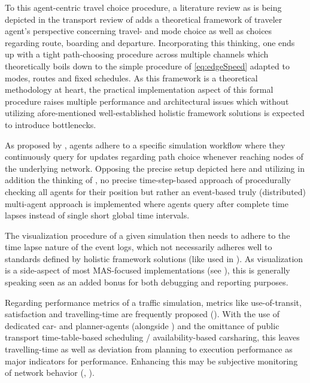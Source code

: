 To this agent-centric travel choice procedure, a literature review as is being depicted in the transport review of \cite{brakewood2018literature} adds a theoretical framework of traveler agent's perspective concerning travel- and mode choice as well as choices regarding route, boarding and departure. Incorporating this thinking, one ends up with a tight path-choosing procedure across multiple channels which theoretically boils down to the simple procedure of \autoref{eq:edgeSpeed} adapted to modes, routes and fixed schedules.
As this framework is a theoretical methodology at heart, the practical implementation aspect of this formal procedure raises multiple performance and architectural issues which without utilizing afore-mentioned well-established holistic framework solutions is expected to introduce bottlenecks.

As proposed by \cite{zargayouna2013agent}, agents adhere to a specific simulation workflow where they continuously query for updates regarding path choice whenever reaching nodes of the underlying network. Opposing the precise setup depicted here and utilizing in addition the thinking of \cite{mastio2015towards}, no precise time-step-based approach of procedurally checking all agents for their position but rather an event-based truly (distributed) multi-agent approach is implemented where agents query after complete time lapses instead of single short global time intervals. 

The visualization procedure of a given simulation then needs to adhere to the time lapse nature of the event logs, which not necessarily adheres well to standards defined by holistic framework solutions (like used in \cite{zargayouna2013agent}\cite{ksontini2016building}). As visualization is a side-aspect of most MAS-focused implementations (see \cite{mastio2015towards}), this is generally speaking seen as an added bonus for both debugging and reporting purposes.

Regarding performance metrics of a traffic simulation, metrics like use-of-transit, satisfaction and travelling-time are frequently proposed (\cite{brakewood2018literature}). With the use of dedicated car- and planner-agents (alongside \cite{zargayouna2013agent}) and the omittance of public transport time-table-based scheduling / availability-based carsharing, this leaves travelling-time as well as deviation from planning to execution performance as major indicators for performance.
Enhancing this may be subjective monitoring of network behavior (\cite{brakewood2018literature}, \cite{zargayouna2013agent}).
